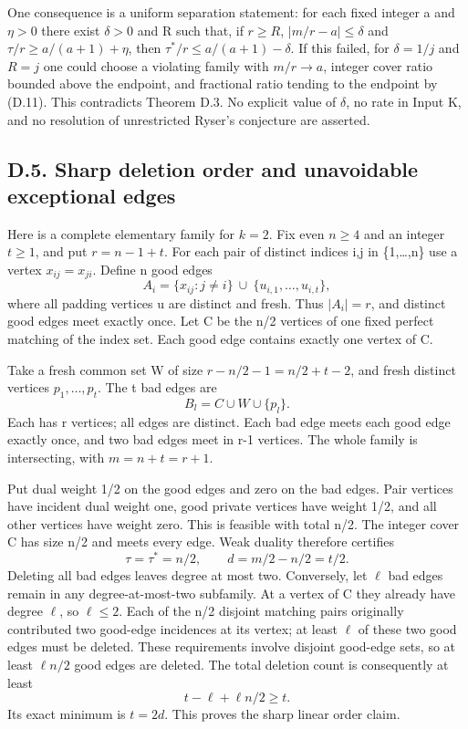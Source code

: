 \documentclass[
  11pt,
]{article}
\begin{document}
One consequence is a uniform separation statement: for each fixed
integer a and \(\eta>0\) there exist \(\delta>0\) and R such that, if
\(r\ge R\), \(|m/r-a|\le\delta\) and \(\tau/r\ge a/(a+1)+\eta\), then
\(\tau^*/r\le a/(a+1)-\delta\). If this failed, for \(\delta=1/j\) and
\(R=j\) one could choose a violating family with \(m/r\to a\), integer
cover ratio bounded above the endpoint, and fractional ratio tending to
the endpoint by (D.11). This contradicts Theorem D.3. No explicit value
of \(\delta\), no rate in Input K, and no resolution of unrestricted
Ryser's conjecture are asserted.

\subsection{D.5. Sharp deletion order and unavoidable exceptional
edges}\label{d.5.-sharp-deletion-order-and-unavoidable-exceptional-edges}

Here is a complete elementary family for \(k=2\). Fix even \(n\ge4\) and
an integer \(t\ge1\), and put \(r=n-1+t\). For each pair of distinct
indices i,j in \{1,\ldots,n\} use a vertex \(x_{ij}=x_{ji}\). Define n
good edges \[
 A_i=\{x_{ij}:j\ne i\}\ \cup\ \{u_{i,1},\ldots,u_{i,t}\},
\] where all padding vertices u are distinct and fresh. Thus
\(|A_i|=r\), and distinct good edges meet exactly once. Let C be the n/2
vertices of one fixed perfect matching of the index set. Each good edge
contains exactly one vertex of C.

Take a fresh common set W of size \(r-n/2-1=n/2+t-2\), and fresh
distinct vertices \(p_1,\ldots,p_t\). The t bad edges are \[
                         B_l=C\cup W\cup\{p_l\}.
\] Each has r vertices; all edges are distinct. Each bad edge meets each
good edge exactly once, and two bad edges meet in r-1 vertices. The
whole family is intersecting, with \(m=n+t=r+1\).

Put dual weight 1/2 on the good edges and zero on the bad edges. Pair
vertices have incident dual weight one, good private vertices have
weight 1/2, and all other vertices have weight zero. This is feasible
with total n/2. The integer cover C has size n/2 and meets every edge.
Weak duality therefore certifies \[
             \tau=\tau^*=n/2,\qquad d=m/2-n/2=t/2.         \tag{D.14}
\] Deleting all bad edges leaves degree at most two. Conversely, let
\(\ell\) bad edges remain in any degree-at-most-two subfamily. At a
vertex of C they already have degree \(\ell\), so \(\ell\le2\). Each of
the n/2 disjoint matching pairs originally contributed two good-edge
incidences at its vertex; at least \(\ell\) of these two good edges must
be deleted. These requirements involve disjoint good-edge sets, so at
least \(\ell n/2\) good edges are deleted. The total deletion count is
consequently at least \[
                     t-\ell+\ell n/2\ge t.
\] Its exact minimum is \(t=2d\). This proves the sharp linear order
claim.
\end{document}
